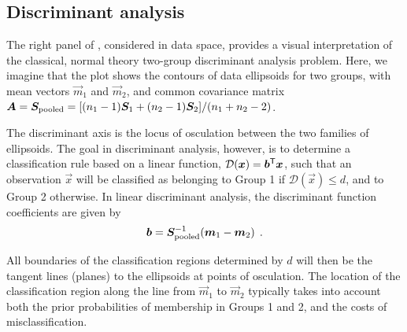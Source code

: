 \subsection{Discriminant analysis}

The right panel of , considered in data space, provides a
visual interpretation of the classical, normal theory two-group discriminant analysis problem.
Here, we imagine that the plot shows the contours of data ellipsoids for two groups,
with mean vectors $\vec{m}_1$ and $\vec{m}_2$, and common covariance matrix
$\bm{A} = \bm{S}_{\textrm{pooled}} = [ (n_1 -1)\bm{S}_1 + (n_2 -1)\bm{S}_2 ] / (n_1 +n_2 -2) $.

The discriminant axis is the locus of osculation between the two families of ellipsoids.
The goal in discriminant analysis, however, is to determine a classification rule based on
a linear function, $\mathcal{D}(\bm{x}) = \bm{b}^\mathsf{T} \bm{x}$, such that
an observation $\vec{x}$ will be classified as belonging to Group 1 if
$\mathcal{D}(\vec{x}) \le d$, and to Group 2 otherwise.  In linear discriminant
analysis, the discriminant function coefficients are
given by
\begin{equation*}
\bm{b} = \bm{S}_{\textrm{pooled}}^{-1} ( \bm{m}_1 - \bm{m}_2 ) \:\: .
\end{equation*}

All boundaries
of the classification regions determined by $d$
will then be the tangent lines (planes) to the ellipsoids at points of osculation.
The location of the classification region along the line from $\vec{m}_1$ to $\vec{m}_2$
typically takes into account both the
prior probabilities of membership in Groups 1 and 2, and the costs of misclassification.




